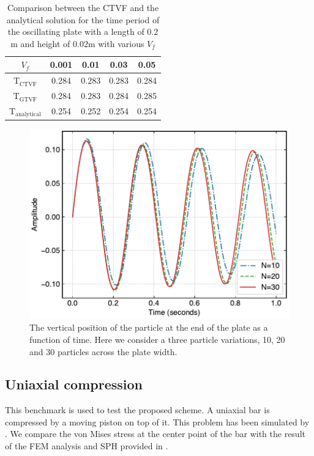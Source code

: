 \documentclass[preprint,12pt]{elsarticle}
\begin{document}
\begin{table}[!htpb]
\centering
\begin{tabular}{c c c c c}
  \hline
  $V_f$ & 0.001 & 0.01 & 0.03 & 0.05 \\
  \hline
  $\text{T}_{\mathrm{CTVF}}$ & 0.284 & 0.283 & 0.283 & 0.284 \\
  $\text{T}_{\mathrm{GTVF}}$ & 0.284 & 0.283 & 0.284 & 0.285 \\
  $\text{T}_{\mathrm{analytical}}$ & 0.254 & 0.252 & 0.254 & 0.254
\end{tabular}
\caption{Comparison between the CTVF and the analytical solution for the time
  period of the oscillating plate with a length of $0.2$m and height of
  $0.02$m with various $V_f$}
\label{table:compare-analytical-with-simulated-h-l-0-1}
\end{table}
\begin{figure}[!htpb]
  \centering
  \includegraphics[width=1\linewidth]{fig_22}
  \caption{The vertical position of the particle at the end of the plate as a
    function of time. Here we consider a three particle variations, 10, 20 and
    30 particles across the plate width.}
\label{fig:oscillating:ipst_convergence_plot}
\end{figure}
%

%
%
%
%
\FloatBarrier%
\subsection{Uniaxial compression}
\label{sec:uniaxial-compression}

This benchmark is used to test the proposed scheme. A uniaxial bar is
compressed by a moving piston on top of it. This problem has been simulated by
\citet{das2015evaluation}. We compare the von Mises stress at the center point
of the bar with the result of the FEM analysis and SPH provided in
\cite{das2015evaluation}.
\end{document}
